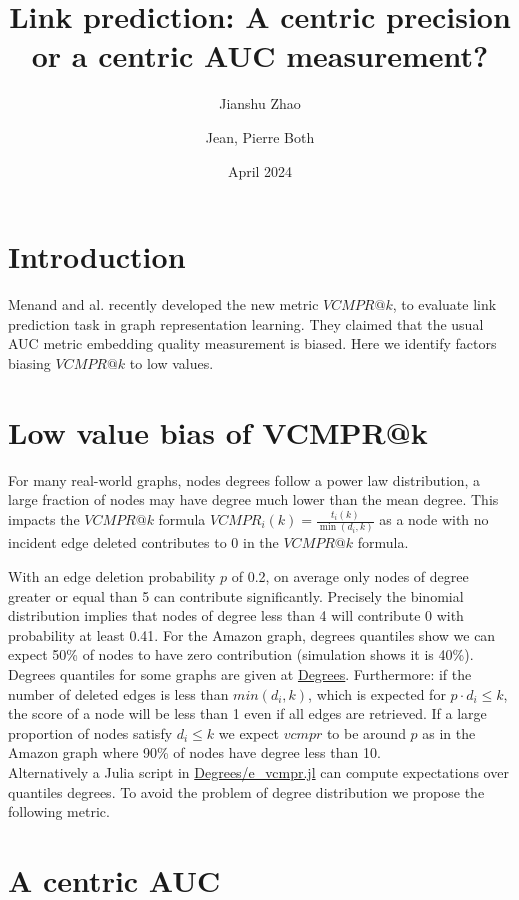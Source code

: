 \documentclass{article}
\title{Link prediction: A centric precision or a centric AUC measurement?}
\author[1]{Jianshu Zhao}
\author[2,*]{Jean, Pierre Both}
\affil[1]{Center for Bioinformatics and Computational Genomics, Georgia Institute of Technology, Atlanta, Georgia, USA}
\affil[2]{Université Paris-Saclay, CEA, List, Palaiseau, France. (Retired)}
\affil[*]{Corresponding author : jeanpierre.both@gmail.com}
\date{April 2024}
\begin{document}
\maketitle

\section{Introduction}

Menand and al. \cite{Menand2024link} recently developed the new metric $VCMPR@k$, to evaluate link prediction task in graph representation learning.
They claimed that the usual AUC metric embedding quality measurement is biased.
Here we identify factors biasing $VCMPR@k$ to low values.


\section{Low value bias of VCMPR@k}
For many real-world graphs, nodes degrees follow a power law distribution, a large fraction of nodes may have degree much lower than the mean degree.
This impacts the $VCMPR@k$ formula $ VCMPR_{i}(k)= \frac{t_{i}(k)}{\min(d_{i},k)}$ as a node with no incident edge deleted contributes to 0 in the $VCMPR@k$ formula.

With an edge deletion probability $p$ of 0.2, on average only nodes of degree greater or equal than 5 can contribute significantly. Precisely the binomial distribution implies that nodes of degree less than 4 will contribute 0 with probability at least 0.41.
For the Amazon graph, degrees quantiles show we can expect 50\% of nodes to have zero contribution (simulation shows it is 40\%).
Degrees quantiles for some graphs are given at \href{https://github.com/jean-pierreBoth/linkauc/tree/master/Degrees}{\color{blue}Degrees}.
Furthermore: if the number of deleted edges is less than $min(d_{i},k)$, which is expected for $p \cdot d_{i} \leq k$, the score of a node will be less than 1 even if all edges are retrieved.
If a large proportion of nodes satisfy $d_{i} \le k$ we expect $vcmpr$ to be around $p$ as in the Amazon graph where 90\% of nodes have degree less than 10.\\
Alternatively a Julia script in \href{https://github.com/jean-pierreBoth/linkauc/tree/master/Degrees}{\color{blue}Degrees/e\_vcmpr.jl} can compute expectations over quantiles degrees.
To avoid the problem of degree distribution we propose the following metric.

\section{A centric AUC}
\end{document}
